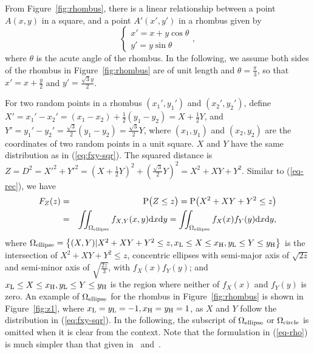 \documentclass[12pt,draftclsnofoot,onecolumn]{IEEEtran}
\begin{document}
From Figure~\ref{fig:rhombus}, there is a linear relationship between a point $A
(x,y)$ in a square, and a point $A' (x',y')$ in a rhombus given by
\begin{equation}\label{eq:xr}
 \left\{
\begin{array}{lc}
x'=x+y\cos \theta \\
y'=y \sin \theta
\end{array}
\right.,
\end{equation}
where $\theta$ is the acute angle of the rhombus. In the following, we
assume both sides of the rhombus in Figure~\ref{fig:rhombus} are of unit
length and $\theta=\frac{\pi}{3}$, so that $x'=x+\frac{y}{2}$ and $y'=\frac{\sqrt{3}y}{2}$.

For two random points in a rhombus $(x_1',y_1')$ and $(x_2',y_2')$, define
$X'=x_1'-x_2'=\left(x_1-x_2\right)+\frac{1}{2}\left(y_1-y_2\right)=X+\frac{1}{2}
Y$, and
$Y'=y_1'-y_2'=\frac{\sqrt{3}}{2}\left(y_1-y_2\right)=\frac{\sqrt{3}}{2}Y$, where
$(x_1, y_1)$ and $(x_2, y_2)$ are the coordinates of two random points in a
unit square. $X$ and $Y$ have the same distribution as in
(\ref{eq:fxy-sqr}). The squared distance is $Z=D^2=X'^2+Y'^2=\left(X+\frac{1}{2}
Y\right)^2+\left(\frac{\sqrt{3}}{2}Y\right)^2=X^2+XY+Y^2$. Similar to
(\ref{eq-rec}), we have
\begin{eqnarray}\label{eq-rho}
F_Z(z)&=&{\rm P}\big(Z \leq z \big) = {\rm P}\big(X^2+XY+Y^2 \leq z \big)\nonumber\\
&=&\iint_{\Omega_{\rm ellipse}}f_{X,Y}(x,y){\rm d}x{\rm d}y=
\iint_{\Omega_{\rm ellipse}}f_X(x)f_Y(y){\rm d}x{\rm d}y,
\end{eqnarray}
where $\Omega_{\rm ellipse}=\left\{(X,Y)|X^2+XY+Y^2\leq z, x_{\rm L} \leq X \leq 
x_{\rm H}, y_{\rm L}\leq Y \leq y_{\rm H}\right\}$ is the intersection of $X^2+XY+Y^2\leq z$, concentric 
ellipses with semi-major axis of $\sqrt{2z}$ and semi-minor axis of $\sqrt{\frac{2z}{3}}$, 
with $f_X(x)f_Y(y)$; and $x_{\rm L} \leq X \leq x_{\rm H}, y_{\rm L}\leq 
Y \leq y_{\rm H}$ is the region where neither of $f_X(x)$ and $f_Y(y)$ is zero.
An example of $\Omega_{\rm ellipse}$ for the rhombus in Figure~\ref{fig:rhombus}
is shown in Figure~\ref{fig:z1}, where $x_{\rm L}=y_{\rm L}=-1, x_{\rm H}=y_{\rm H}=1$, 
as $X$ and $Y$ follow the distribution in (\ref{eq:fxy-sqr}).
In the following, the subscript of $\Omega_{\rm ellipse}$ or $\Omega_{\rm circle}$ is
omitted when it is clear from the context.
Note that the formulation in (\ref{eq-rho}) is much simpler than that given in~\cite{zhuang2011random}
and~\cite{zhuang2012geometrical}.
\end{document}
